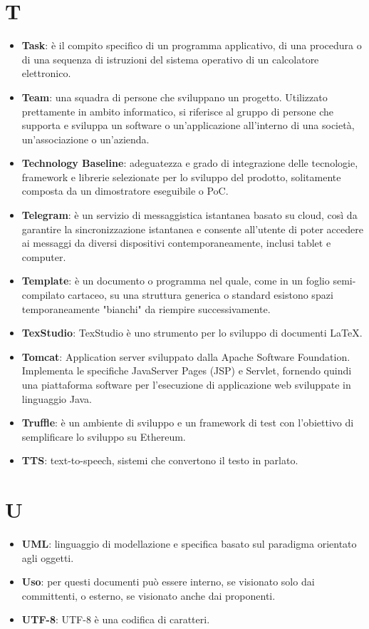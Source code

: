 \documentclass[a4paper, oneside, openany, dvipsnames, table]{article}
\begin{document}
\section{T}
\begin{itemize}
\item \textbf{Task}: è il compito specifico di un programma applicativo, di una procedura o di una sequenza di istruzioni del sistema operativo di un calcolatore elettronico.
\item \textbf{Team}: una squadra di persone che sviluppano un progetto. Utilizzato prettamente in ambito informatico, si riferisce al gruppo di persone che supporta e sviluppa
un software o un’applicazione all’interno di una società, un’associazione o un’azienda.
\item \textbf{Technology Baseline}: adeguatezza e grado di integrazione delle tecnologie, framework e librerie selezionate per lo sviluppo del prodotto, solitamente composta da un dimostratore eseguibile o PoC.
\item \textbf{Telegram}: è un servizio di messaggistica istantanea basato su cloud, così da garantire la sincronizzazione istantanea e consente all'utente di poter accedere ai messaggi da diversi dispositivi contemporaneamente, inclusi tablet e computer.
\item \textbf{Template}: è un documento o programma nel quale, come in un foglio semi-compilato cartaceo, su una struttura generica o standard esistono spazi temporaneamente "bianchi" da riempire successivamente.
\item \textbf{TexStudio}: TexStudio è uno strumento per lo sviluppo di documenti \LaTeX.
\item \textbf{Tomcat}: Application server sviluppato dalla Apache Software Foundation. Implementa le specifiche JavaServer Pages (JSP) e Servlet, fornendo quindi una piattaforma software per l’esecuzione di applicazione web sviluppate in linguaggio Java.
\item \textbf{Truffle}: è un ambiente di sviluppo e un framework di test con l'obiettivo di semplificare lo sviluppo su Ethereum.
\item \textbf{TTS}: text-to-speech, sistemi che convertono il testo in parlato.
\end{itemize}

\section{U}
\begin{itemize}
\item \textbf{UML}: linguaggio di modellazione e specifica basato sul paradigma orientato agli oggetti.
\item \textbf{Uso}: per questi documenti può essere interno, se visionato solo dai committenti, o esterno, se visionato anche dai proponenti.
\item \textbf{UTF-8}: UTF-8 è una codifica di caratteri.
\end{itemize}
\end{document}
